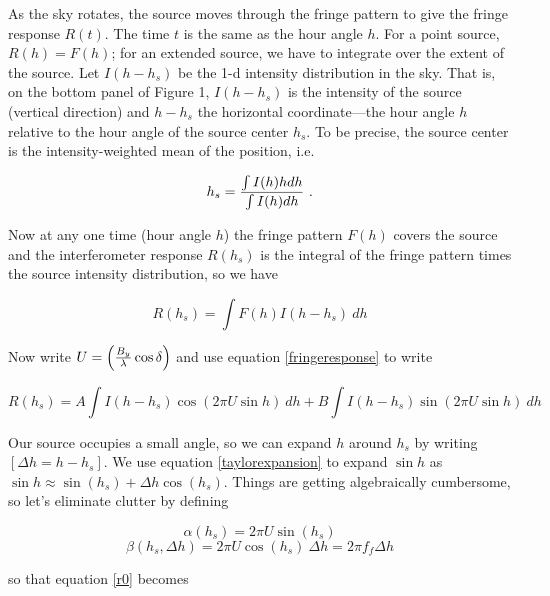 \documentclass[11pt,preprint]{aastex}
\begin{document}
	As the sky rotates, the source moves through the fringe pattern
to give the fringe response $R(t)$. The time $t$ is the same as the hour
angle $h$. For a point source, $R(h)= F(h)$; for an extended source, we
have to integrate over the extent of the source.  Let $I(h - h_s)$ be
the 1-d intensity distribution in the sky. That is, on the bottom panel
of Figure 1, $I(h - h_s)$ is the intensity of the source (vertical
direction) and $h-h_s$ the horizontal coordinate---the hour angle $h$
relative to the hour angle of the source center $h_s$. To be precise,
the source center is the intensity-weighted mean of the position, i.e.

\begin{equation}
h_s = { \int I(h)h dh \over \int I(h) dh} \ .
\end{equation}

	Now at any one time (hour angle $h$) the fringe pattern $F(h)$
covers the source and the interferometer response $R(h_s)$ is the integral
of the fringe pattern times the source intensity distribution, so we
have

\begin{equation}
R(h_s) = \int F(h) I(h-h_s) \ d h
\end{equation}

\noindent Now write $U = \left( {B_y \over \lambda} \cos\delta \right)$
and use equation \ref {fringeresponse} to write

\begin{equation} \label{r0}
R(h_s) = A \int I(h-h_s) \cos( 2\pi U \sin h) \ dh +  
	B \int I(h-h_s) \sin( 2\pi U \sin h) \ dh
\end{equation} 

	Our source occupies a small angle, so we can expand $h$ around $h_s$
by writing $[\Delta h = h-h_s]$. We use equation \ref{taylorexpansion} to
expand $\sin h$ as $\sin h \approx \sin( h_s) + \Delta h \cos( h_s)$.
Things are getting algebraically cumbersome, so let's eliminate
clutter by defining 

\begin{mathletters}
\begin{equation}
\alpha(h_s) = 2 \pi U \sin(h_s) 
\end{equation}
\begin{equation}
\beta(h_s, \Delta h) = 2 \pi U \cos(h_s) \  \Delta h = 2 \pi f_f \Delta h
\end{equation}
\end{mathletters}

\noindent [where $U = \left( {B \over \lambda} \cos\delta \right)$] so that equation \ref{r0} becomes
\end{document}
